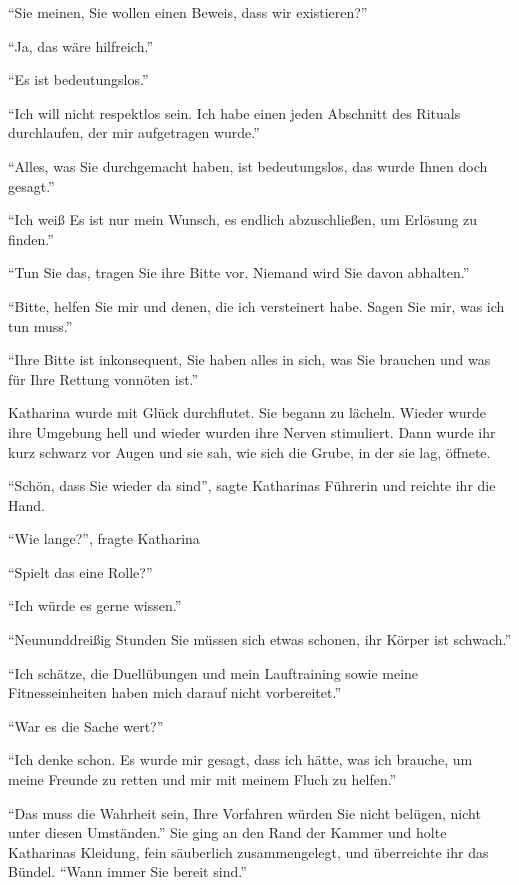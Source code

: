 \enquote{Sie meinen, Sie wollen einen Beweis, dass wir existieren?}

\enquote{Ja, das wäre hilfreich.}

\enquote{Es ist bedeutungslos.}

\enquote{Ich will nicht respektlos sein. Ich habe einen jeden Abschnitt des Rituals durchlaufen, der mir aufgetragen wurde.}

\enquote{Alles, was Sie durchgemacht haben, ist bedeutungslos, das wurde Ihnen doch gesagt.}

\enquote{Ich weiß \gst Es ist nur mein Wunsch, es endlich abzuschließen, um Erlösung zu finden.}

\enquote{Tun Sie das, tragen Sie ihre Bitte vor. Niemand wird Sie davon abhalten.}

\enquote{Bitte, helfen Sie mir und denen, die ich versteinert habe. Sagen Sie mir, was ich tun muss.}

\enquote{Ihre Bitte ist inkonsequent, Sie haben alles in sich, was Sie brauchen und was für Ihre Rettung vonnöten ist.}

Katharina wurde mit Glück durchflutet. Sie begann zu lächeln. Wieder wurde ihre Umgebung hell und wieder wurden ihre Nerven stimuliert. Dann wurde ihr kurz schwarz vor Augen und sie sah, wie sich die Grube, in der sie lag, öffnete.

\enquote{Schön, dass Sie wieder da sind}, sagte Katharinas Führerin und reichte ihr die Hand.

\enquote{Wie lange?}, fragte Katharina

\enquote{Spielt das eine Rolle?}

\enquote{Ich würde es gerne wissen.}

\enquote{Neununddreißig Stunden \gst Sie müssen sich etwas schonen, ihr Körper ist schwach.}

\enquote{Ich schätze, die Duellübungen und mein Lauftraining sowie meine Fitnesseinheiten haben mich darauf nicht vorbereitet.}

\enquote{War es die Sache wert?}

\enquote{Ich denke schon. Es wurde mir gesagt, dass ich hätte, was ich brauche, um meine Freunde zu retten und mir mit meinem Fluch zu helfen.}

\enquote{Das muss die Wahrheit sein, Ihre Vorfahren würden Sie nicht belügen, nicht unter diesen Umständen.} Sie ging an den Rand der Kammer und holte Katharinas Kleidung, fein säuberlich zusammengelegt, und überreichte ihr das Bündel. \enquote{Wann immer Sie bereit sind.}

